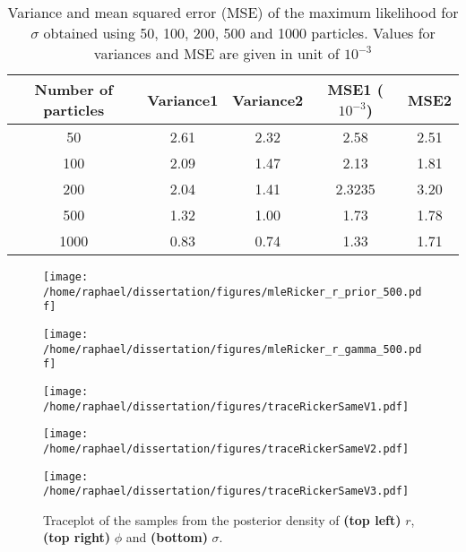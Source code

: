 \documentclass[12pt]{article}
\newcommand{\ra}[1]{\renewcommand{\arraystretch}{#1}}
\begin{document}
	\begin{table}[htb]
		\centering
		\ra{1.3}
		\begin{tabular}{@{}ccccc@{}} \toprule
			Number of particles & Variance1 &  Variance2 & MSE1 ($10^{-3}$)& MSE2\\ \midrule
			50 & 2.61 & 2.32 & 2.58 & 2.51\\
			100 & 2.09 & 1.47 & 2.13 & 1.81\\
			200 & 2.04 & 1.41 &  2.3235  & 3.20\\ 
			500 & 1.32 & 1.00 & 1.73 & 1.78\\
			1000 & 0.83 & 0.74 & 1.33 & 1.71 \\  \bottomrule
		\end{tabular}
		\caption{Variance and mean squared error (MSE) of the maximum likelihood for $\sigma$ obtained using 50, 100, 200, 500 and 1000 particles. Values for variances and MSE are given in unit of $10^{-3}$}
		\label{table:mleSigma}
	\end{table}

	\begin{figure}[htb]
		\centering
		\begin{minipage}{0.4\textwidth}
			\centering
			\texttt{[image: /home/raphael/dissertation/figures/mleRicker\_r\_prior\_500.pdf]}
		\end{minipage}
		\begin{minipage}{0.4\textwidth}
			\centering
			\texttt{[image: /home/raphael/dissertation/figures/mleRicker\_r\_gamma\_500.pdf]}
		\end{minipage}
		\caption{}
		\label{fig:comparisonR}
	\end{figure}
	
	\begin{figure}[htb]
		\centering
		\begin{minipage}{0.4\textwidth}
			\centering
			\texttt{[image: /home/raphael/dissertation/figures/traceRickerSameV1.pdf]}
		\end{minipage}
		\begin{minipage}{0.4\textwidth}
			\centering
			\texttt{[image: /home/raphael/dissertation/figures/traceRickerSameV2.pdf]}
		\end{minipage}
		\begin{minipage}{0.4\textwidth}
			\centering
			\texttt{[image: /home/raphael/dissertation/figures/traceRickerSameV3.pdf]}
		\end{minipage}
		\caption{Traceplot of the samples from the posterior density of \textbf{(top left)} $r$, \textbf{(top right)} $\phi$ and \textbf{(bottom)} $\sigma$.}
		\label{fig:traceplotDiag}
	\end{figure}
	
\end{document}
